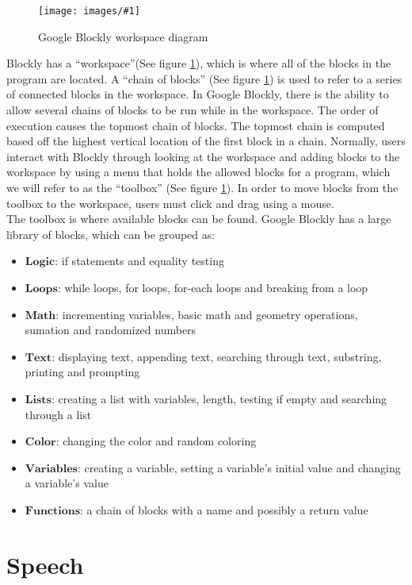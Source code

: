 \documentclass[]{article}
\newcommand\fig[3]{
\begin{figure}
  \begin{center}
  \texttt{[image: images/\#1]}
  \caption{#2} 
  \label{fig:#1}
  \end{center}
\end{figure}
}
\begin{document}
\fig{workspaceDiagram.jpg}{Google Blockly workspace diagram}{width=7cm}

Blockly has a ``workspace''(See figure \ref{fig:workspaceDiagram.jpg}), which is where all of the blocks in the program are located. A ``chain of blocks''
(See figure \ref{fig:workspaceDiagram.jpg}) is used to refer to a series of connected blocks in the workspace. In Google Blockly,  
there is the ability to allow several chains of blocks to be run while
in the workspace. The order of execution causes the topmost chain of blocks. The topmost chain
is computed based off the highest vertical location of the first block in a chain. Normally, users interact
with Blockly through looking at the workspace and adding blocks to the workspace by
using a menu that holds the allowed blocks for a program, which we will refer to as the 
``toolbox'' (See figure \ref{fig:workspaceDiagram.jpg}). In order to move blocks from the toolbox to the 
workspace, users must click and drag using a mouse. \\

The toolbox is where available blocks can be found. Google Blockly has a large library of blocks, which can be grouped as:
\begin{itemize}
  \item$\textbf{Logic}$: if statements and equality testing
  \item$\textbf{Loops}$: while loops, for loops, for-each loops and breaking from a loop
  \item$\textbf{Math}$: incrementing variables, basic math and geometry operations, sumation and randomized numbers
  \item$\textbf{Text}$: displaying text, appending text, searching through text, substring, printing and prompting
  \item$\textbf{Lists}$: creating a list with variables, length, testing if empty and searching through a list
  \item$\textbf{Color}$: changing the color and random coloring
  \item$\textbf{Variables}$: creating a variable, setting a variable's initial value and changing a variable's value
  \item$\textbf{Functions}$: a chain of blocks with a name and possibly a return value
\end{itemize}

\section{Speech}
\end{document}

